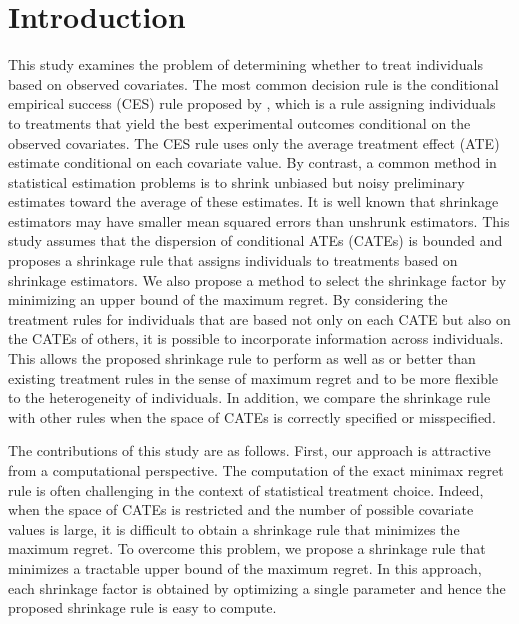 \documentclass[12pt,a4paper]{article}
\begin{document}
\section{Introduction}
This study examines the problem of determining whether to treat individuals based on observed covariates. The most common decision rule is the conditional empirical success (CES) rule proposed by \cite{manski2004statistical}, which is a rule assigning individuals to treatments that yield the best experimental outcomes conditional on the observed covariates. The CES rule uses only the average treatment effect (ATE) estimate conditional on each covariate value. By contrast, a common method in statistical estimation problems is to shrink unbiased but noisy preliminary estimates toward the average of these estimates. It is well known that shrinkage estimators may have smaller mean squared errors than unshrunk estimators. This study assumes that the dispersion of conditional ATEs (CATEs) is bounded and proposes a shrinkage rule that assigns individuals to treatments based on shrinkage estimators. We also propose a method to select the shrinkage factor by minimizing an upper bound of the maximum regret. By considering the treatment rules for individuals that are based not only on each CATE but also on the CATEs of others, it is possible to incorporate information across individuals. This allows the proposed shrinkage rule to perform as well as or better than existing treatment rules in the sense of maximum regret and to be more flexible to the heterogeneity of individuals. In addition, we compare the shrinkage rule with other rules when the space of CATEs is correctly specified or misspecified.

The contributions of this study are as follows. First, our approach is attractive from a computational perspective. The computation of the exact minimax regret rule is often challenging in the context of statistical treatment choice. Indeed, when the space of CATEs is restricted and the number of possible covariate values is large, it is difficult to obtain a shrinkage rule that minimizes the maximum regret. To overcome this problem, we propose a shrinkage rule that minimizes a tractable upper bound of the maximum regret. In this approach, each shrinkage factor is obtained by optimizing a single parameter and hence the proposed shrinkage rule is easy to compute.
\end{document}
